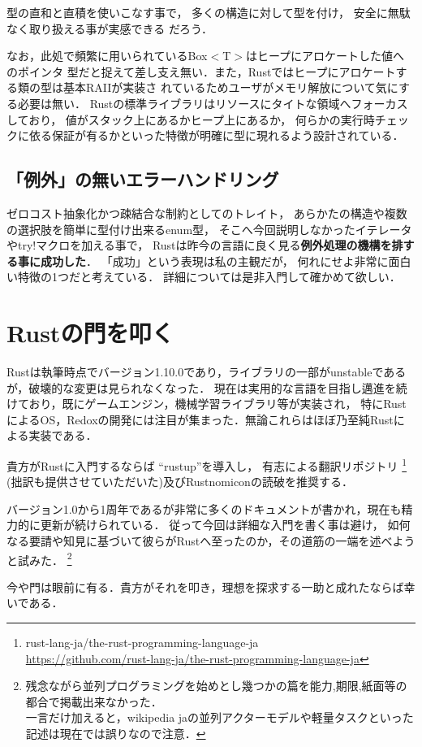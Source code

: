 型の直和と直積を使いこなす事で，
多くの構造に対して型を付け，
安全に無駄なく取り扱える事が実感できる
だろう．

なお，此処で頻繁に用いられているBox$<$T$>$はヒープにアロケートした値へのポインタ
型だと捉えて差し支え無い．また，Rustではヒープにアロケートする類の型は基本RAIIが実装さ
れているためユーザがメモリ解放について気にする必要は無い．
Rustの標準ライブラリはリソースにタイトな領域へフォーカスしており，
値がスタック上にあるかヒープ上にあるか，
何らかの実行時チェックに依る保証が有るかといった特徴が明確に型に現れるよう設計されている．

\subsection{「例外」の無いエラーハンドリング}
ゼロコスト抽象化かつ疎結合な制約としてのトレイト，
あらかたの構造や複数の選択肢を簡単に型付け出来るenum型，
そこへ今回説明しなかったイテレータやtry!マクロを加える事で，
Rustは昨今の言語に良く見る\textbf{例外処理の機構を排する事に成功した}．
「成功」という表現は私の主観だが，
何れにせよ非常に面白い特徴の1つだと考えている．
詳細については是非入門して確かめて欲しい．

\section{Rustの門を叩く}
Rustは執筆時点でバージョン1.10.0であり，ライブラリの一部がunstableであるが，破壊的な変更は見られなくなった．
現在は実用的な言語を目指し邁進を続けており，既にゲームエンジン，機械学習ライブラリ等が実装され，
特にRustによるOS，Redoxの開発には注目が集まった．無論これらはほぼ乃至純Rustによる実装である．

貴方がRustに入門するならば ``rustup''を導入し，
有志による翻訳リポジトリ
\footnote{rust-lang-ja/the-rust-programming-language-ja \\
  \url{https://github.com/rust-lang-ja/the-rust-programming-language-ja}}
(拙訳も提供させていただいた)及びRustnomiconの読破を推奨する．

バージョン1.0から1周年であるが非常に多くのドキュメントが書かれ，現在も精力的に更新が続けられている．
従って今回は詳細な入門を書く事は避け，
如何なる要請や知見に基づいて彼らがRustへ至ったのか，その道筋の一端を述べようと試みた．
\footnote{残念ながら並列プログラミングを始めとし幾つかの篇を能力,期限,紙面等の都合で掲載出来なかった．
  \\ 一言だけ加えると，wikipedia jaの並列アクターモデルや軽量タスクといった記述は現在では誤りなので注意．}

今や門は眼前に有る．貴方がそれを叩き，理想を探求する一助と成れたならば幸いである．
